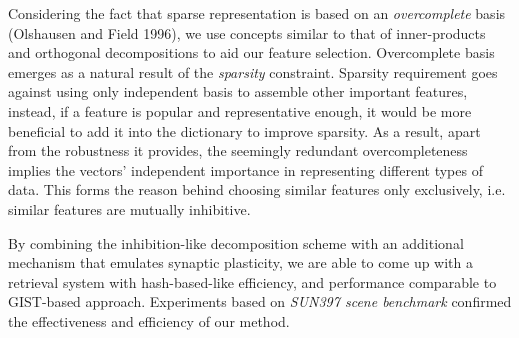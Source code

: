 \documentclass[letterpaper]{article}
\begin{document}
Considering the fact that sparse representation is based on an \emph{overcomplete} basis (Olshausen and Field 1996), we use concepts similar to that of inner-products and orthogonal decompositions to aid our feature selection. Overcomplete basis emerges as a natural result of the \emph{sparsity} constraint. Sparsity requirement goes against using only independent basis to assemble other important features, instead, if a feature is popular and representative enough, it would be more beneficial to add it into the dictionary to improve sparsity. As a result, apart from the robustness it provides, the seemingly redundant overcompleteness implies the vectors' independent importance in representing different types of data. This forms the reason behind choosing similar features only exclusively, i.e. similar features are mutually inhibitive. 

By combining the inhibition-like decomposition scheme with an additional mechanism that emulates synaptic plasticity, we are able to come up with a retrieval system with hash-based-like efficiency, and performance comparable to GIST-based approach. Experiments based on \emph{SUN397 scene benchmark} confirmed the effectiveness and efficiency of our method.


\end{document}
